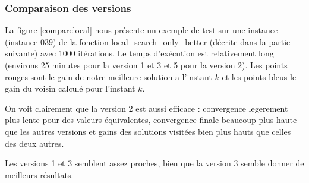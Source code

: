 \documentclass[10pt,a4paper]{article}
\begin{document}
\subsubsection{Comparaison des versions}

La figure \ref{comparelocal} nous présente un exemple de test sur une instance (instance 039) de la fonction local\_search\_only\_better (décrite dans la partie suivante) avec 1000 itérations. Le temps d’exécution est relativement long (environs 25 minutes pour la version 1 et 3 et 5 pour la version 2). Les points rouges sont le gain de notre meilleure solution a l'instant $k$ et les points bleus le gain du voisin calculé pour l'instant $k$.

On voit clairement que la version 2 est aussi efficace : convergence legerement plus lente pour des valeurs équivalentes, convergence finale beaucoup plus haute que les autres versions et gains des solutions visitées bien plus hauts que celles des deux autres. 

Les versions 1 et 3 semblent assez proches, bien que la version 3 semble donner de meilleurs résultats.
\end{document}

